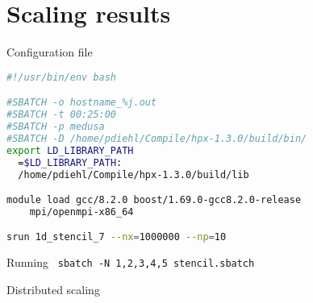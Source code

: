 \documentclass[\classoption]{beamer}
\begin{document}
\section{Scaling results}

\begin{frame}[fragile]{Configuration file}

\begin{lstlisting}[language=bash]
#!/usr/bin/env bash

#SBATCH -o hostname_%j.out
#SBATCH -t 00:25:00
#SBATCH -p medusa
#SBATCH -D /home/pdiehl/Compile/hpx-1.3.0/build/bin/
export LD_LIBRARY_PATH
  =$LD_LIBRARY_PATH:
  /home/pdiehl/Compile/hpx-1.3.0/build/lib

module load gcc/8.2.0 boost/1.69.0-gcc8.2.0-release 
	mpi/openmpi-x86_64   

srun 1d_stencil_7 --nx=1000000 --np=10 
\end{lstlisting}

\begin{block}{Running}
\lstinline| sbatch -N 1,2,3,4,5 stencil.sbatch|
\end{block}

\end{frame}

\begin{frame}{Distributed scaling}

\begin{center}
\end{center}
\end{frame}
\end{document}
